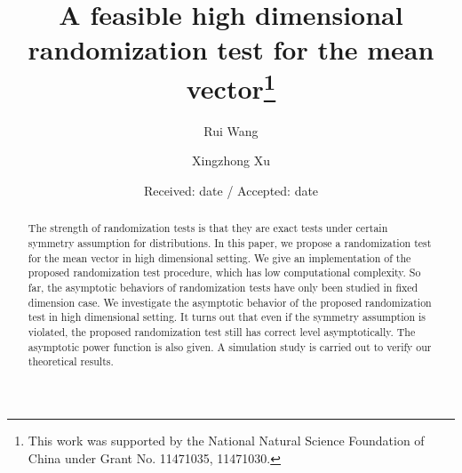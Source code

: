 \documentclass[smallcondensed,final,natbib]{svjour3}          %
\begin{document}
\title{A feasible high dimensional randomization test for the mean vector\thanks{This work was supported by the National Natural Science Foundation of China under Grant No. 11471035, 11471030.
}
}


\author{Rui Wang         \and
        Xingzhong Xu  %
}



\date{Received: date / Accepted: date}


\maketitle

\begin{abstract}
    The strength of randomization tests is that they are exact tests under certain symmetry assumption for distributions.
    In this paper, we propose a randomization test for the mean vector in high dimensional setting. 
    We give an implementation of the proposed randomization test procedure, which has low computational complexity.
    So far, the asymptotic behaviors of randomization tests have only been studied in fixed dimension case.
    We investigate the asymptotic behavior of the proposed randomization test in high dimensional setting.
    It turns out that even if the symmetry assumption is violated, the proposed randomization test still has correct level asymptotically.
    The asymptotic power function is also given.
    A simulation study is carried out to verify our theoretical results.
    

\end{abstract}
\end{document}
